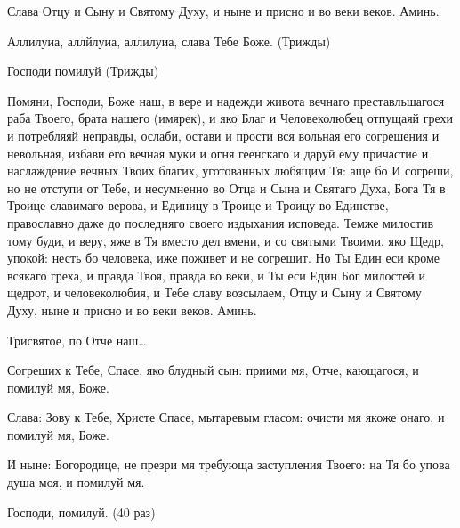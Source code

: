 Слава Отцу и Сыну и Святому Духу, и ныне и присно и во веки веков. Аминь. 

Аллилуиа, аллйлуиа, аллилуиа, слава Тебе Боже. (Трижды) 

Господи помилуй (Трижды)




Помяни, Господи, Боже наш, в вере и надежди живота вечнаго преставльшагося раба Твоего, брата нашего (имярек), и яко Благ и Человеколюбец отпущаяй грехи и потребляяй неправды, ослаби, остави и прости вся вольная его согрешения и невольная, избави его вечная муки и огня геенскаго и даруй ему причастие и наслаждение вечных Твоих благих, уготованных любящим Тя: аще бо И согреши, но не отступи от Тебе, и несумненно во Отца и Сына и Святаго Духа, Бога Тя в Троице славимаго верова, и Единицу в Троице и Троицу во Единстве, православно даже до последняго своего издыхания исповеда. Темже милостив тому буди, и веру, яже в Тя вместо дел вмени, и со святыми Твоими, яко Щедр, упокой: несть бо человека, иже поживет и не согрешит. Но Ты Един еси кроме всякаго греха, и правда Твоя, правда во веки, и Ты еси Един Бог милостей и щедрот, и человеколюбия, и Тебе славу возсылаем, Отцу и Сыну и Святому Духу, ныне и присно и во веки веков. Аминь. 


Трисвятое, по Отче наш… 


Согреших к Тебе, Спасе, яко блудный сын: приими мя, Отче, кающагося, и помилуй мя, Боже. 

Слава: Зову к Тебе, Христе Спасе, мытаревым гласом: очисти мя якоже онаго, и помилуй мя, Боже. 

И ныне: Богородице, не презри мя требующа заступления Твоего: на Тя бо упова душа моя, и помилуй мя. 

Господи, помилуй. (40 раз)




